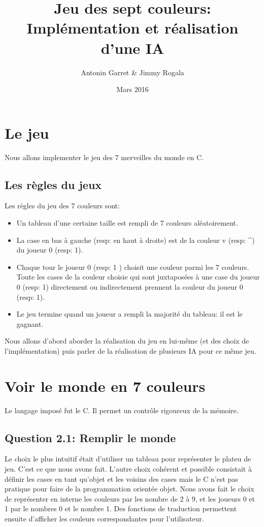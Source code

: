 \documentclass{article}
\title{Jeu des sept couleurs: Implémentation et réalisation d'une IA}
\author{Antonin Garret & Jimmy Rogala}
\date{Mars 2016}
\begin{document}
\maketitle
\tableofcontents
\clearpage
\section{Le jeu}
Nous allons implementer le jeu des 7 merveilles du monde en C.

  \subsection{Les règles du jeux}
    Les règles du jeu des 7 couleurs sont:
    \begin{itemize} %
      \item Un tableau d'une certaine taille est rempli de 7 couleurs aléatoirement.
      \item La case en bas à gauche (resp: en haut à droite) est de la couleur v (resp: \textasciicircum ) du joueur 0 (resp: 1).
      \item Chaque tour le joueur 0 (resp: 1 ) choisit une couleur parmi les 7 couleurs. Toute les cases de la couleur choisie qui sont juxtaposées à une case du joueur 0 (resp: 1) directement ou indirectement prennent la couleur du joueur 0 (resp: 1).
      \item Le jeu termine quand un joueur a rempli la majorité du tableau: il est le gagnant.
    \end{itemize}

    Nous allons d'abord aborder la réalisation du jeu en lui-même (et des choix de l'implémentation) puis parler de la réalisation de plusieurs IA pour ce même jeu.


\section{Voir le monde en 7 couleurs}
    Le langage imposé fut le C. Il permet un contrôle rigoureux de la mémoire.
    \subsection{Question 2.1: Remplir le monde}
      Le choix le plus intuitif était d'utiliser un tableau pour représenter le plateu de jeu. C'est ce que nous avons fait. L'autre choix cohérent et possible consistait à définir les cases en tant qu'objet et les voisins des cases mais le C n'est pas pratique pour faire de la programmation orientée objet.
      Nous avons fait le choix de représenter en interne les couleurs par les nombre de 2 à 9, et les joueurs 0 et 1 par le nombres 0 et le nombre 1. Des fonctions de traduction permettent ensuite d'afficher les couleurs correspondantes pour l'utilisateur.
\end{document}
